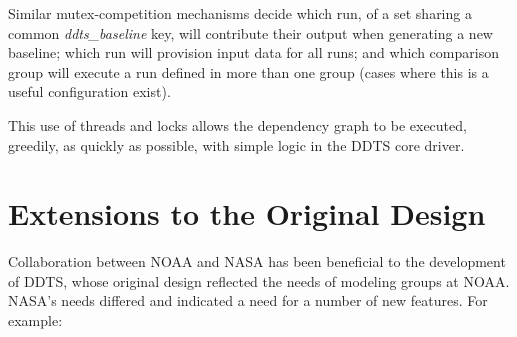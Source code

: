 \documentclass[conference]{IEEEtran}
\begin{document}
Similar mutex-competition mechanisms decide which run, of a set sharing a common \emph{ddts\_baseline} key, will contribute their output when generating a new baseline; which run will provision input data for all runs; and which comparison group will execute a run defined in more than one group (cases where this is a useful configuration exist).

This use of threads and locks allows the dependency graph to be executed, greedily, as quickly as possible, with simple logic in the DDTS core driver.

\section{Extensions to the Original Design}

Collaboration between NOAA and NASA has been beneficial to the development of DDTS, whose original design reflected the needs of modeling groups at NOAA. NASA's needs differed and indicated a need for a number of new features. For example:
\end{document}
